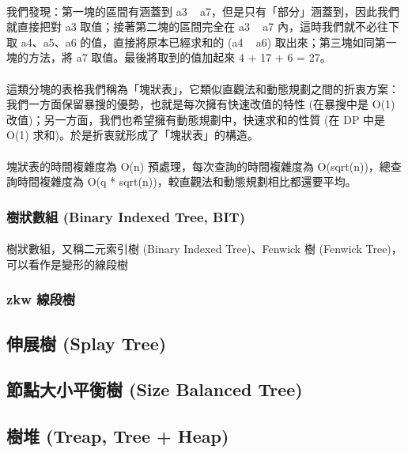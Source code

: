 \documentclass[12pt,a4paper,oneside]{report}
\begin{document}
\begin{CJK}{UTF8}{bkai}
\paragraph{}我們發現：第一塊的區間有涵蓋到 a3 ~ a7，但是只有「部分」涵蓋到，因此我們就直接把對 a3 取值；接著第二塊的區間完全在 a3 ~ a7 內，這時我們就不必往下取 a4、a5、a6 的值，直接將原本已經求和的 (a4 ~ a6) 取出來；第三塊如同第一塊的方法，將 a7 取值。最後將取到的值加起來 4 + 17 + 6 = 27。

\paragraph{}這類分塊的表格我們稱為「塊狀表」，它類似直觀法和動態規劃之間的折衷方案：我們一方面保留暴搜的優勢，也就是每次擁有快速改值的特性 (在暴搜中是 O(1) 改值)；另一方面，我們也希望擁有動態規劃中，快速求和的性質 (在 DP 中是 O(1) 求和)。於是折衷就形成了「塊狀表」的構造。

\paragraph{}塊狀表的時間複雜度為 O(n) 預處理，每次查詢的時間複雜度為 O(sqrt(n))，總查詢時間複雜度為 O(q * sqrt(n))，較直觀法和動態規劃相比都還要平均。

\subsubsection{樹狀數組 (Binary Indexed Tree, BIT)}

\paragraph{}樹狀數組，又稱二元索引樹 (Binary Indexed Tree)、Fenwick 樹 (Fenwick Tree)，可以看作是變形的線段樹

\subsubsection{zkw 線段樹}


\subsection{伸展樹 (Splay Tree)}

\subsection{節點大小平衡樹 (Size Balanced Tree)}

\subsection{樹堆 (Treap, Tree + Heap)}


\end{CJK}
\end{document}
